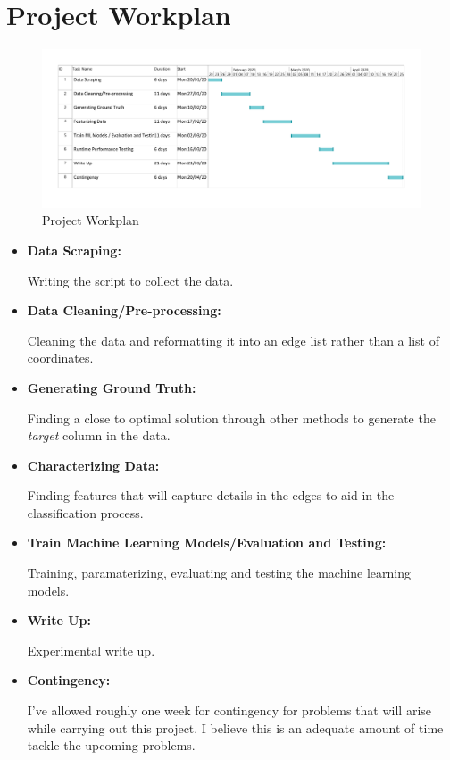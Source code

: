 \documentclass[]{UCD_CS_FYP_Report}
\begin{document}
\chapter{Project Workplan}
\begin{figure}[h]
    \centering
  \includegraphics[width=1\linewidth]{Figures/GanttChart.pdf}
  \caption{Project Workplan}
  \label{fig:Workplan}
\end{figure}

\begin{itemize}
    \item \textbf{Data Scraping: }
    
    Writing the script to collect the data.
    \item \textbf{Data Cleaning/Pre-processing: }
    
    Cleaning the data and reformatting it into an edge list rather than a list of coordinates.
    \item \textbf{Generating Ground Truth: }
    
    Finding a close to optimal solution through other methods to generate the \textit{target} column in the data.
    \item \textbf{Characterizing Data: }
    
    Finding features that will capture details in the edges to aid in the classification process.
    \item \textbf{Train Machine Learning Models/Evaluation and Testing: }
    
    Training, paramaterizing, evaluating and testing the machine learning models.
    \item \textbf{Write Up: }
    
    Experimental write up.
    \item \textbf{Contingency: }
    
    I've allowed roughly one week for contingency for problems that will arise while carrying out this project. I believe this is an adequate amount of time tackle the upcoming problems.
\end{itemize}
\end{document}
